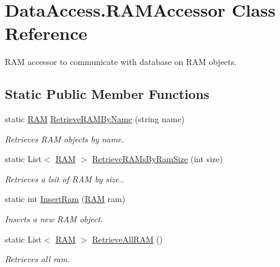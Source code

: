 \hypertarget{class_data_access_1_1_r_a_m_accessor}{}\section{Data\+Access.\+R\+A\+M\+Accessor Class Reference}
\label{class_data_access_1_1_r_a_m_accessor}


R\+AM accessor to communicate with database on R\+AM objects.  


\subsection*{Static Public Member Functions}
\begin{DoxyCompactItemize}
\item 
static \hyperlink{class_business_objects_1_1_r_a_m}{R\+AM} \hyperlink{class_data_access_1_1_r_a_m_accessor_a903aeb4e4272d308ea264e966e5094fd}{Retrieve\+R\+A\+M\+By\+Name} (string name)
\begin{DoxyCompactList}\small\item\em Retrieves R\+AM objects by name. \end{DoxyCompactList}\item 
static List$<$ \hyperlink{class_business_objects_1_1_r_a_m}{R\+AM} $>$ \hyperlink{class_data_access_1_1_r_a_m_accessor_a7c82934381a0762e5a6701f395304047}{Retrieve\+R\+A\+Ms\+By\+Ram\+Size} (int size)
\begin{DoxyCompactList}\small\item\em Retrieves a lsit of R\+AM by size.. \end{DoxyCompactList}\item 
static int \hyperlink{class_data_access_1_1_r_a_m_accessor_ae5528c3e8a6b429cc9dcdd93bdea0455}{Insert\+Ram} (\hyperlink{class_business_objects_1_1_r_a_m}{R\+AM} ram)
\begin{DoxyCompactList}\small\item\em Inserts a new R\+AM object. \end{DoxyCompactList}\item 
static List$<$ \hyperlink{class_business_objects_1_1_r_a_m}{R\+AM} $>$ \hyperlink{class_data_access_1_1_r_a_m_accessor_a46250ae0e09eac9ad659efd9969bdbd3}{Retrieve\+All\+R\+AM} ()
\begin{DoxyCompactList}\small\item\em Retrieves all ram. \end{DoxyCompactList}\end{DoxyCompactItemize}


